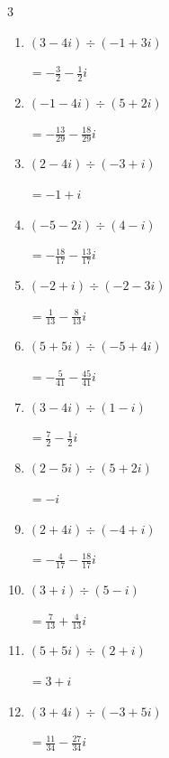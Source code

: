 \begin{multicols}{3}
\begin{enumerate}
        $\displaystyle =-\frac{7}{10}-\frac{1}{10}i$

  \item $\displaystyle (3-4i)\div(-1+3i)$

        $\displaystyle =-\frac{3}{2}-\frac{1}{2}i$

  \item $\displaystyle (-1-4i)\div(5+2i)$

        $\displaystyle =-\frac{13}{29}-\frac{18}{29}i$

  \item $\displaystyle (2-4i)\div(-3+i)$

        $\displaystyle =-1+i$

  \item $\displaystyle (-5-2i)\div(4-i)$

        $\displaystyle =-\frac{18}{17}-\frac{13}{17}i$

  \item $\displaystyle (-2+i)\div(-2-3i)$

        $\displaystyle =\frac{1}{13}-\frac{8}{13}i$

\columnbreak %

  \item $\displaystyle (5+5i)\div(-5+4i)$

        $\displaystyle =-\frac{5}{41}-\frac{45}{41}i$

  \item $\displaystyle (3-4i)\div(1-i)$

        $\displaystyle =\frac{7}{2}-\frac{1}{2}i$

  \item $\displaystyle (2-5i)\div(5+2i)$

        $\displaystyle =-i$

  \item $\displaystyle (2+4i)\div(-4+i)$

        $\displaystyle =-\frac{4}{17}-\frac{18}{17}i$

  \item $\displaystyle (3+i)\div(5-i)$

        $\displaystyle =\frac{7}{13}+\frac{4}{13}i$

  \item $\displaystyle (5+5i)\div(2+i)$

        $\displaystyle =3+i$

  \item $\displaystyle (3+4i)\div(-3+5i)$

        $\displaystyle =\frac{11}{34}-\frac{27}{34}i$


\end{enumerate}
\end{multicols}

